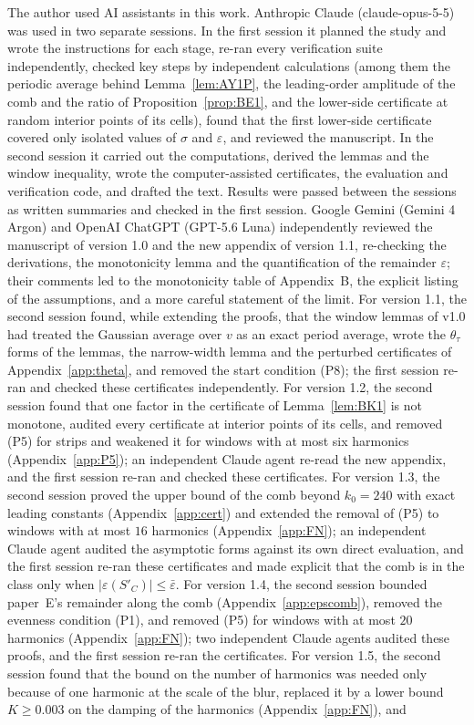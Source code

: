 \begin{acknowledgments}
The author used AI assistants in this work. Anthropic Claude (\mbox{claude-opus-5-5}) was used in two separate sessions. In the first session it planned the study and wrote the instructions for each stage, re-ran every verification suite independently, checked key steps by independent calculations (among them the periodic average behind Lemma~\ref{lem:AY1P}, the leading-order amplitude of the comb and the ratio of Proposition~\ref{prop:BE1}, and the lower-side certificate at random interior points of its cells), found that the first lower-side certificate covered only isolated values of $\sigma$ and $\varepsilon$, and reviewed the manuscript. In the second session it carried out the computations, derived the lemmas and the window inequality, wrote the computer-assisted certificates, the evaluation and verification code, and drafted the text. Results were passed between the sessions as written summaries and checked in the first session. Google Gemini (Gemini 4 Argon) and OpenAI ChatGPT (GPT-5.6 Luna) independently reviewed the manuscript of version 1.0 and the new appendix of version 1.1, re-checking the derivations, the monotonicity lemma and the quantification of the remainder $\varepsilon$; their comments led to the monotonicity table of Appendix~B, the explicit listing of the assumptions, and a more careful statement of the limit. For version 1.1, the second session found, while extending the proofs, that the window lemmas of v1.0 had treated the Gaussian average over $v$ as an exact period average, wrote the $\theta_\tau$ forms of the lemmas, the narrow-width lemma and the perturbed certificates of Appendix~\ref{app:theta}, and removed the start condition (P8); the first session re-ran and checked these certificates independently. For version 1.2, the second session found that one factor in the certificate of Lemma~\ref{lem:BK1} is not monotone, audited every certificate at interior points of its cells, and removed (P5) for strips and weakened it for windows with at most six harmonics (Appendix~\ref{app:P5}); an independent Claude agent re-read the new appendix, and the first session re-ran and checked these certificates. For version 1.3, the second session proved the upper bound of the comb beyond $k_0=240$ with exact leading constants (Appendix~\ref{app:cert}) and extended the removal of (P5) to windows with at most $16$ harmonics (Appendix~\ref{app:FN}); an independent Claude agent audited the asymptotic forms against its own direct evaluation, and the first session re-ran these certificates and made explicit that the comb is in the class only when $|\varepsilon(S'_C)|\le\bar\varepsilon$. For version 1.4, the second session bounded paper~E's remainder along the comb (Appendix~\ref{app:epscomb}), removed the evenness condition (P1), and removed (P5) for windows with at most $20$ harmonics (Appendix~\ref{app:FN}); two independent Claude agents audited these proofs, and the first session re-ran the certificates. For version 1.5, the second session found that the bound on the number of harmonics was needed only because of one harmonic at the scale of the blur, replaced it by a lower bound $K\ge0.003$ on the damping of the harmonics (Appendix~\ref{app:FN}), and 
\end{acknowledgments}
